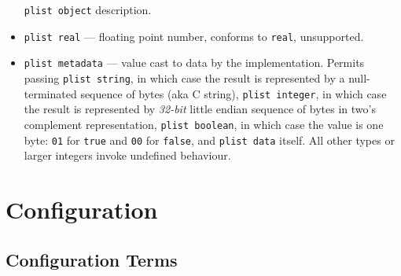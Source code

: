 \documentclass[]{article}
\begin{document}
\begin{itemize}
  \texttt{plist\ object} description.
\item
  \texttt{plist\ real} --- floating point number, conforms to
  \texttt{real}, unsupported.
\item
  \texttt{plist\ metadata} --- value cast to data by the implementation.
  Permits passing \texttt{plist\ string}, in which case the result is
  represented by a null-terminated sequence of bytes (aka C string),
  \texttt{plist\ integer}, in which case the result is represented by
  \emph{32-bit} little endian sequence of bytes in two's complement
  representation, \texttt{plist\ boolean}, in which case the value is
  one byte: \texttt{01} for \texttt{true} and \texttt{00} for
  \texttt{false}, and \texttt{plist\ data} itself. All other types or
  larger integers invoke undefined behaviour.
\end{itemize}

\section{Configuration}\label{configuration-overview}

\subsection{Configuration Terms}\label{configuration-terms}
\end{document}
